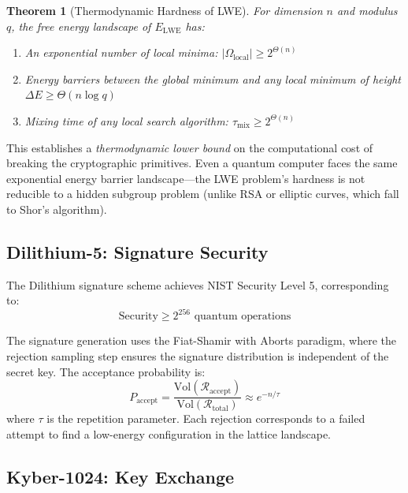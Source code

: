 \documentclass[12pt,a4paper,twocolumn]{article}
\newtheorem{theorem}{Theorem}
\begin{document}
\begin{theorem}[Thermodynamic Hardness of LWE]
For dimension $n$ and modulus $q$, the free energy landscape of $E_{\mathrm{LWE}}$ has:
\begin{enumerate}[label=(\roman*)]
\item An exponential number of local minima: $|\Omega_{\mathrm{local}}| \geq 2^{\Theta(n)}$
\item Energy barriers between the global minimum and any local minimum of height $\Delta E \geq \Theta(n \log q)$
\item Mixing time of any local search algorithm: $\tau_{\mathrm{mix}} \geq 2^{\Theta(n)}$
\end{enumerate}
\end{theorem}

This establishes a \emph{thermodynamic lower bound} on the computational cost of breaking the cryptographic primitives. Even a quantum computer faces the same exponential energy barrier landscape---the LWE problem's hardness is not reducible to a hidden subgroup problem (unlike RSA or elliptic curves, which fall to Shor's algorithm).

\subsection{Dilithium-5: Signature Security}

The Dilithium signature scheme achieves NIST Security Level 5, corresponding to:
\begin{equation}
\text{Security} \geq 2^{256} \text{ quantum operations}
\end{equation}

The signature generation uses the Fiat-Shamir with Aborts paradigm, where the rejection sampling step ensures the signature distribution is independent of the secret key. The acceptance probability is:
\begin{equation}
P_{\mathrm{accept}} = \frac{\mathrm{Vol}(\mathcal{R}_{\mathrm{accept}})}{\mathrm{Vol}(\mathcal{R}_{\mathrm{total}})} \approx e^{-n/\tau}
\end{equation}
where $\tau$ is the repetition parameter. Each rejection corresponds to a failed attempt to find a low-energy configuration in the lattice landscape.

\subsection{Kyber-1024: Key Exchange}
\end{document}
